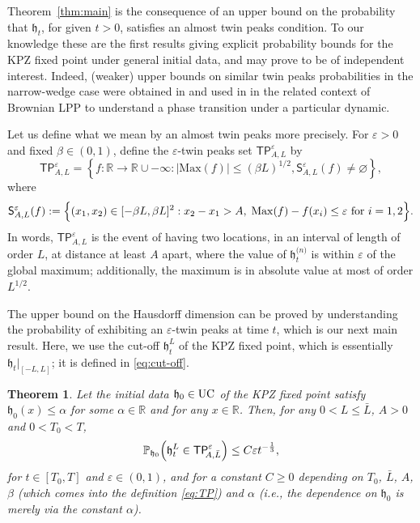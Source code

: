 \documentclass[oneside,final,11pt]{amsart}
\newtheorem{thm}{Theorem}[section]
\theoremstyle{definition}
\newcommand{\fh}{\mathfrak{h}}
\newcommand{\h}{\fh^{{\scriptscriptstyle(}n{\scriptscriptstyle)}}}
\newcommand{\TP}[1]{\mathsf{TP}_{\!\!#1}}
\newcommand{\TPS}[1]{\mathsf{S}_{#1}}
\newcommand{\bJ}{\mathsf{J}}
\newcommand{\R}{\mathbb{R}}
\newcommand{\1}[1]{\mathbf{1}_{#1}}
\newcommand{\eps}{\varepsilon}
\newcommand{\uptext}[1]{\text{\upshape{#1}}}
\DeclareMathOperator{\UC}{\uptext{UC}}
\newcommand{\Max}{\mathrm{Max}}
\renewcommand{\P}{\mathbb P}
\let\emptyset\varnothing
\numberwithin{equation}{section}
\begin{document}
Theorem~\ref{thm:main} is the consequence of an upper bound on the probability that $\fh_t$, for given $t>0$, satisfies an almost twin peaks condition. To our knowledge these are the first results giving explicit probability bounds for the KPZ fixed point under general initial data, and may prove to be of independent interest. Indeed, (weaker) upper bounds on similar twin peaks probabilities in the narrow-wedge case were obtained in \cite{calvert2019brownian,LPPtools} and used in \cite{LPPdynamics} in the related context of Brownian LPP to understand a phase transition under a particular dynamic.

Let us define what we mean by an almost twin peaks more precisely. For $\varepsilon>0$ and fixed $\beta\in(0,1)$, define the $\varepsilon$-twin peaks set $\TP{A, L}^{\eps}$ by
%
\begin{equation}\label{eq:TP}
\TP{A, L}^{\eps} = \left\{f: \R\to\R\cup{-\infty} : |\Max(f)| \leq (\beta L)^{1/2}, \TPS{A, L}^{\eps}(f) \neq\emptyset\right\},
\end{equation}
%
where
$$\TPS{A, L}^{\eps}(f) := \Bigl\{(x_1, x_2) \in [-\beta L, \beta L]^2 : x_2 - x_1 > A,\; \Max(f) - f(x_i) \leq \eps ~\text{for}~ i=1,2\Bigr\}.$$
%
In words, $\TP{A,L}^\eps$ is the event of having two locations, in an interval of length of order $L$, at distance at least $A$ apart, where the value of $\h_t$ is within $\varepsilon$ of the global maximum; additionally, the maximum is in absolute value at most of order $L^{1/2}$.

The upper bound on the Hausdorff dimension can be proved by understanding the probability of exhibiting an $\varepsilon$-twin peaks at time $t$, which is our next main result. Here, we use the cut-off $\fh_t^L$ of the KPZ fixed point, which is essentially $\fh_t|_{[-L,L]}$; it is defined in \eqref{eq:cut-off}.

\begin{thm}\label{thm:densities2-intro}
Let the initial data $\fh_0 \in \UC$ of the KPZ fixed point satisfy $\fh_0(x) \leq \alpha$ for some $\alpha \in \R$ and for any $x \in \R$. %
Then, for any $0 < L \leq \bar L$, $A > 0$ and $0 < T_0 < T$, 
\begin{equation}\label{eq:q_def}
\P_{\fh_0} \Bigl(\fh^L_t \in \TP{A, \bar L}^{\eps}\Bigr) \leq C \eps t^{-\frac{1}{3}},
\end{equation}
for $t \in [T_0, T]$ and $\eps \in (0,1)$, and for a constant $C \geq 0$ depending on $T_0$, $\bar L$, $A$, $\beta$ (which comes into the definition \eqref{eq:TP}) and $\alpha$ (i.e., the dependence on $\fh_0$ is merely via the constant $\alpha$).
\end{thm}
\end{document}
